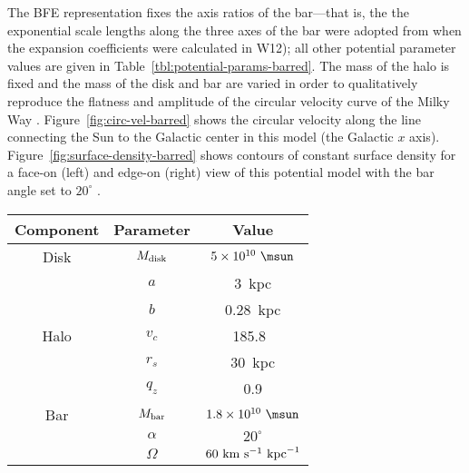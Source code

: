 \documentclass[letterpaper,12pt,preprint]{aastex}
\begin{document}
The BFE representation fixes the axis ratios of the bar---that is, the the exponential scale lengths along the three axes of the bar were adopted from \cite{dwek95} when the expansion coefficients were calculated in W12); all other potential parameter values are given in Table~\ref{tbl:potential-params-barred}. The mass of the halo is fixed and the mass of the disk and bar are varied in order to qualitatively reproduce the flatness and amplitude of the circular velocity curve of the Milky Way \citep{bovy12}. Figure~\ref{fig:circ-vel-barred} shows the circular velocity along the line connecting the Sun to the Galactic center in this model (the Galactic $x$ axis). Figure~\ref{fig:surface-density-barred} shows contours of constant surface density for a face-on (left) and edge-on (right) view of this potential model with the bar angle set to $20^\circ$ \citep[compare to, e.g., Figure 3 in][]{portail15}. 

\begin{table*}[ht]
\begin{center}
	\begin{tabular}{ c | c | c }
	         \toprule
	         Component & Parameter & Value \\\toprule
		Disk & $M_{\rm disk}$ & $5 \times 10^{10}~\msun$ \\
		& $a$ & 3~{\rm kpc}\\
		& $b$ & 0.28~{\rm kpc} \\\midrule
	         Halo & $v_c$ & 185.8~\kms\\
		& $r_s$ & 30~kpc \\
		& $q_z$ & 0.9 \\\midrule
		Bar & $M_{\rm bar}$ & $1.8 \times 10^{10}~\msun$ \\
		& $\alpha$ & $20^\circ$\\
		& $\Omega$ & $60~{\rm km}~{\rm s}^{-1}~{\rm kpc}^{-1}$ \\
		\bottomrule
		\end{tabular}
	\caption{The disk potential scale lengths ($a$, $b$) were adopted following \citep{bovy15-galpy} to match the exponential scale length of the disk \citep{bovyrix13} and local dark-matter density \citep[e.g.,][]{bovytremaine12}. The bar mass is taken from recent 3D density modeling of red clump stars in the Galactic bulge \citep{portail15}. The bar angle, $\alpha$, and pattern speed, $\Omega$, are taken taken from \cite{dwek95} and \cite{wang12}, respectively. Halo flattening is taken from recent work that suggests the inner Milky Way halo is slightly oblate \citep{koposov10, kuepper15}. The halo mass scale is set by specifying the circular velocity at the scale radius, $v_c$, and the scale velocity in Equation~\ref{eq:flatnfw} is given by $v_h^2 = v_c^2 / (\ln2 - 1/2)$. \label{tbl:potential-params-barred}}
\end{center}
\end{table*}
\end{document}
